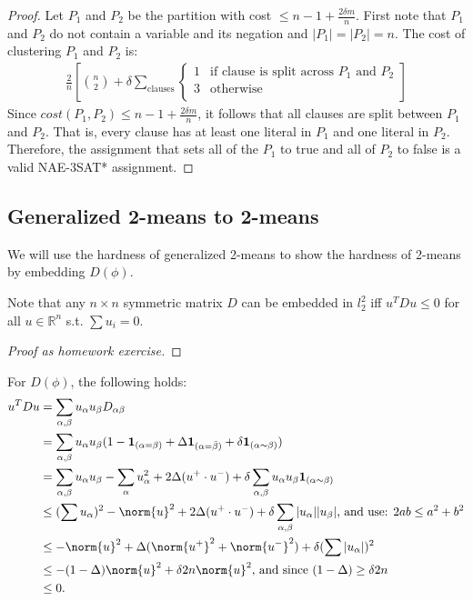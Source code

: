 \begin{proof}
Let $P_1$ and $P_2$ be the partition with cost $\le n - 1 +
\frac{2\delta m}{n}$.  First note that $P_1$ and $P_2$ do not contain
a variable and its negation and $|P_1| = |P_2| = n$.  The cost of
clustering $P_1$ and $P_2$ is:
\begin{align*}
  \frac{2}{n} \left[ {n \choose 2} + \delta \sum_{\textrm{clauses}} 
  \begin{cases}
    1 & \textrm{if clause is split across $P_1$ and $P_2$}\\  
    3 & \textrm{otherwise} \\ 
  \end{cases}\right]
\end{align*}
Since $cost(P_1, P_2) \le n - 1 + \frac{2\delta m}{n}$, it follows that all
clauses are split between $P_1$ and $P_2$.  That is, every clause has
at least one literal in $P_1$ and one literal in $P_2$.  Therefore,
the assignment that sets all of the $P_1$ to true and all of $P_2$ to
false is a valid NAE-3SAT* assignment. 
\end{proof}



\subsection{Generalized 2-means to 2-means}
We will use the hardness of generalized 2-means to show the hardness
of 2-means by embedding $D(\phi)$.
\begin{fact}
Note that any $n \times n$ symmetric matrix $D$ can be embedded in
$l_2^2$ iff $u^TDu  \le 0$ for all $u \in \mathbb{R}^n$ s.t. $\sum u_i
= 0$. 
\end{fact}
\begin{proof}[Proof as homework exercise]
\end{proof}

\begin{fact} \label{d-phi-fact}
For $D(\phi)$, the following holds:
\begin{align*}
u^TDu &= \sum_{\alpha, \beta} u_\alpha u_\beta D_{\alpha \beta}\\ 
&=\sum_{\alpha, \beta} u_\alpha u_\beta (1 - \mathbf{1}_{(\alpha =
  \beta)} + \Delta\mathbf{1}_{(\alpha = \bar{\beta})} + \delta
\mathbf{1}_{(\alpha \sim \beta)})\\ 
&=\sum_{\alpha, \beta} u_\alpha u_\beta - \sum_{\alpha} u_\alpha^2
+2\Delta (u^+ \cdot u^-) + \delta \sum_{\alpha, \beta} u_\alpha
u_\beta \mathbf{1}_{(\alpha \sim \beta)}\\ 
& \le (\sum u_\alpha)^2  - \norm{u}^2 + 2\Delta (u^+ \cdot u^-) +
\delta \sum_{\alpha, \beta} |u_\alpha| |u_\beta| \textrm{,  and use: }
  2ab \le a^2 + b^2\\  
& \le - \norm{u}^2 + \Delta (\norm{u^+}^2  + \norm{u^-}^2) + \delta
(\sum |u_\alpha|)^2 \\ 
& \le -(1- \Delta) \norm{u}^2  + \delta 2n \norm{u}^2 \textrm{,  and
    since } (1- \Delta) \ge \delta 2n \\ 
& \le 0.
\end{align*}
\end{fact}


